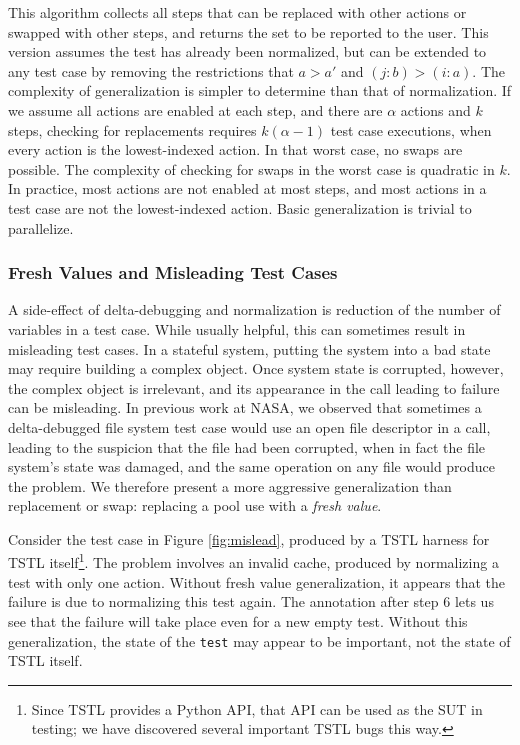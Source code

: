 This algorithm collects all steps that can be replaced with other
actions or swapped with other steps, and returns the set to be
reported to the user.  This version assumes the test has already been
normalized, but can be extended to any test case by removing the
restrictions that $a > a'$ and $(j : b) > (i : a)$.  The complexity of
generalization is simpler to determine than that of normalization.  If
we assume all actions are enabled at each step, and there are $\alpha$
actions and $k$ steps, checking for replacements requires $k (\alpha-1)$
test case executions, when every action is the lowest-indexed action.
In that worst case, no swaps are possible.  The complexity of checking
for swaps in the worst case is quadratic in $k$.  In practice, most
actions are not enabled at most steps, and most actions in a test case
are not the lowest-indexed action.  Basic generalization is trivial to
parallelize.


\subsubsection{Fresh Values and Misleading Test Cases}
\label{freshgen}

A side-effect of delta-debugging and normalization is reduction of the
number of variables in a test case.  While usually helpful, this can
sometimes result in misleading test cases.  In a stateful system,
putting the system into a bad state may require building a complex
object.  Once system state is corrupted, however, the complex object
is irrelevant, and its appearance in the call leading to failure can
be misleading.  In previous work at NASA, we observed that sometimes a
delta-debugged file system test case \cite{ICSEDiff,AMAI} would use an
open file descriptor in a call, leading to the suspicion that the file
had been corrupted, when in fact the file system's state was damaged,
and the same operation on any file would produce the problem.  We
therefore present a more aggressive generalization than replacement or
swap: replacing a pool use with a \emph{fresh value}.

Consider the test case in Figure \ref{fig:mislead}, produced by a
TSTL harness for  TSTL itself\footnote{Since TSTL
  provides a Python API, that API can be used as the SUT in testing;
  we have discovered several important TSTL bugs this way.}.  The
problem involves an invalid cache, produced by normalizing a test with
only one action.  Without fresh value generalization, it appears that
the failure is due to normalizing this test again.
The annotation after step 6 lets us see that the failure
will take place even for a new empty test.
Without this generalization, the state of the {\tt test} may
appear to be important, not the state of  TSTL itself.

